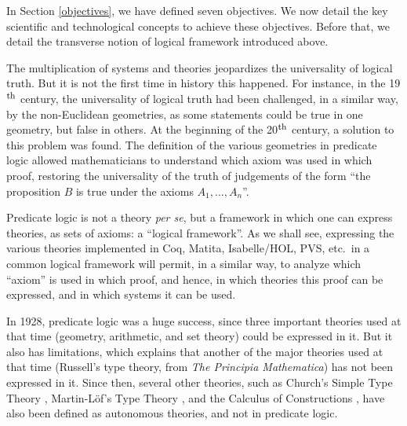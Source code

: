 
In Section \ref{objectives}, we have defined seven objectives. We now detail 
the key scientific and technological concepts to achieve these objectives. 
Before that, we detail the transverse notion of logical framework 
introduced above. 


The multiplication of systems and theories jeopardizes the
universality of logical truth. But it is not the first time in history
this happened.  For instance, in the 19$^{\mbox{\footnotesize th}}$
century, the universality of logical truth had been challenged, in a
similar way, by the non-Euclidean geometries, as some statements could
be true in one geometry, but false in others. At the beginning of the
20$^{\mbox{\footnotesize th}}$ century, a solution to this problem was
found.  The definition of the various geometries in predicate logic
\cite{HilbertAckermann} allowed mathematicians to understand which
axiom was used in which proof, restoring the universality of the truth
of judgements of the form ``the proposition $B$ is true under the
axioms $A_1, ..., A_n$''.

Predicate logic is not a theory {\em per se}, but a framework in
which one can express theories, as sets of axioms: a ``logical
framework''. As we shall see, expressing the various theories
implemented in Coq, Matita, Isabelle/HOL, PVS, etc.\ in a common
logical framework will permit, in a similar way, to analyze which
``axiom'' is used in which proof, and hence, in which theories this
proof can be expressed, and in which systems it can be used.

In 1928, predicate logic was a huge success, since three important
theories used at that time (geometry, arithmetic, and set theory)
could be expressed in it. But it also has limitations, which explains
that another of the major theories used at that time (Russell's type
theory, from {\em The Principia Mathematica}) has not been expressed
in it. Since then, several other theories, such as Church's Simple Type
Theory \cite{Church40}, Martin-L\"of's Type Theory
\cite{Martin-Lof84}, and the Calculus of Constructions
\cite{CoquandHuet88}, have also been defined as autonomous theories,
and not in predicate logic.



